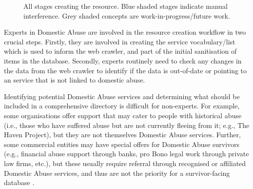 \documentclass[conference]{IEEEtran}
\begin{document}
\begin{figure}
\begin{center}
\caption{All stages creating the resource. Blue shaded stages indicate manual interference. Grey shaded concepts are work-in-progress/future work.}
\label{fig:stages}
\end{center}
\end{figure}

Experts in Domestic Abuse are involved in the resource creation workflow in two crucial steps.
Firstly, they are involved in creating the service vocabulary/list which is used to inform the web crawler, and part of the initial sanitisation of items in the database.
Secondly, experts routinely need to check any changes in the data from the web crawler to identify if the data is out-of-date or pointing to an service that is not linked to domestic abuse.

Identifying potential Domestic Abuse services and determining what should be included in a comprehensive directory is difficult for non-experts. 
For example, some organisations offer support that may cater to people with historical abuse (i.e., those who have suffered abuse but are not currently fleeing from it; e.g., The Haven Project\cite{haven}), but they are not themselves Domestic Abuse services.
Further, some commercial entities may have special offers for Domestic Abuse survivors (e.g., financial abuse support through banks, pro Bono legal work through private law firms, etc.), but these usually require referral through recognised or affiliated Domestic Abuse services, and thus are not the priority for a survivor-facing database \cite{enduser}.  
\end{document}
